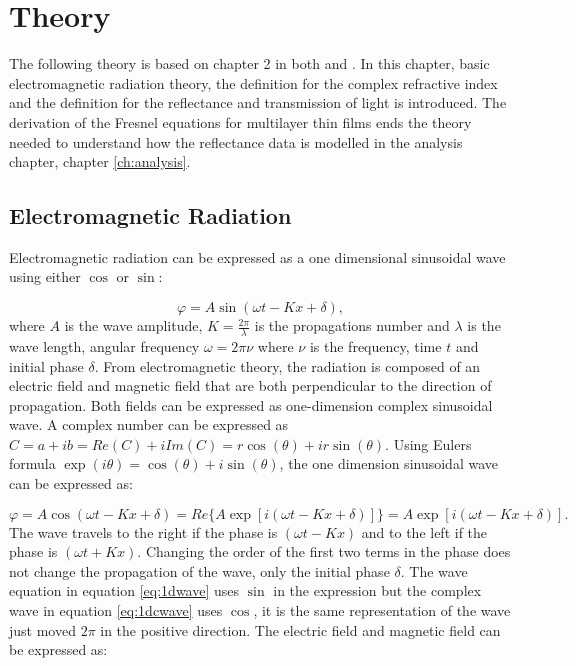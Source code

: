 \documentclass[MasterThesisMain.tex]{subfiles}
\begin{document}
\chapter{Theory}\label{lighttheory}

The following theory is based on chapter 2 in both \cite{fujiwara2007spectroscopic} and \cite{tompkins2015spectroscopic}. In this chapter, basic electromagnetic radiation theory, the definition for the complex refractive index and the definition for the reflectance and transmission of light is introduced. The derivation of the Fresnel equations for multilayer thin films ends the theory needed to understand how the reflectance data is modelled in the analysis chapter, chapter \ref{ch:analysis}.

\section{Electromagnetic Radiation}
Electromagnetic radiation can be expressed as a one dimensional sinusoidal wave using either $\cos$ or $\sin$:

\begin{equation}\label{eq:1dwave}
\varphi = A\sin(\omega t - Kx +\delta),
\end{equation}
where $A$ is the wave amplitude, $K=\frac{2\pi}{\lambda}$ is the propagations number and $\lambda$ is the wave length, angular frequency $\omega = 2\pi\nu$ where $\nu$ is the frequency, time $t$ and initial phase $\delta$.
From electromagnetic theory, the radiation is composed of an electric field and magnetic field that are both perpendicular to the direction of propagation. Both fields can be expressed as one-dimension complex sinusoidal wave. A complex number can be expressed as $C= a + ib =Re(C) + i Im(C) =r\cos(\theta)+ir\sin(\theta)$. Using Eulers formula $\exp(i\theta)=\cos(\theta)+i\sin(\theta)$, the one dimension sinusoidal wave can be expressed as:

\begin{equation}\label{eq:1dcwave}
\varphi=A\cos(\omega t- Kx +\delta) = Re \{A\exp[i(\omega t- Kx +\delta)]\} = A\exp[i(\omega t - Kx + \delta)]. 
\end{equation}
The wave travels to the right if the phase is $(\omega t - Kx)$ and to the left if the phase is $(\omega t + Kx)$. Changing the order of the first two terms in the phase does not change the propagation of the wave, only the initial phase $\delta$. The wave equation in equation \ref{eq:1dwave} uses $\sin$ in the expression but the complex wave in equation \ref{eq:1dcwave} uses $\cos$, it is the same representation of the wave just moved $2\pi$ in the positive direction. The electric field and magnetic field can be expressed as:
\end{document}
